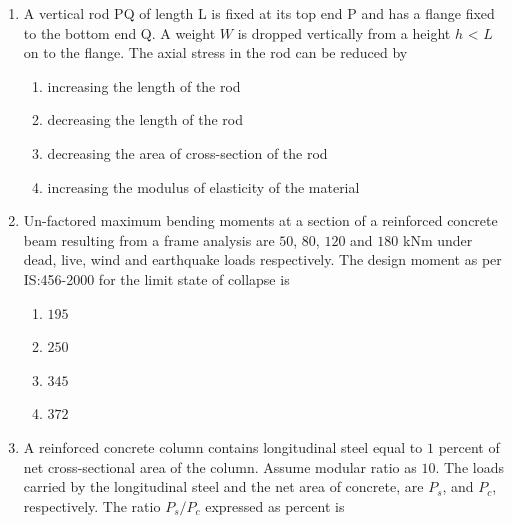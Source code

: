 \documentclass[journal]{IEEEtran}
\begin{document}
\begin{enumerate}
\vspace{0.1cm}

\begin{enumerate}
\end{enumerate}

\item A vertical rod PQ of length L is fixed at its top end P and has a flange fixed to the bottom end Q. A weight $W$ is dropped vertically from a height $h$ < $L$ on to the flange. The axial stress in the rod can be reduced by \hfill {}

\begin{enumerate}
\item increasing the length of the rod 
\item decreasing the length of the rod
\item decreasing the area of cross-section of the rod
\item increasing the modulus of elasticity of the material
\end{enumerate}

\item Un-factored maximum bending moments at a section of a reinforced concrete beam resulting from
a frame analysis are $50$, $80$, $120$ and $180$ kNm under dead, live, wind and earthquake loads
respectively. The design moment  as per IS:456-2000 for the limit state of collapse 
is \hfill {}

\begin{enumerate}
\item $195$
\item $250$
\item $345$
\item $372$
\end{enumerate}

\item A reinforced concrete column contains longitudinal steel equal to $1$ percent of net cross-sectional area of the column. Assume modular ratio as $10$. The loads carried  by the longitudinal steel and the net area of concrete, are $P_s$, and $P_c$, respectively. The ratio $P_s/P_c$ expressed
as percent is \hfill {}


\end{enumerate}
\end{document}
